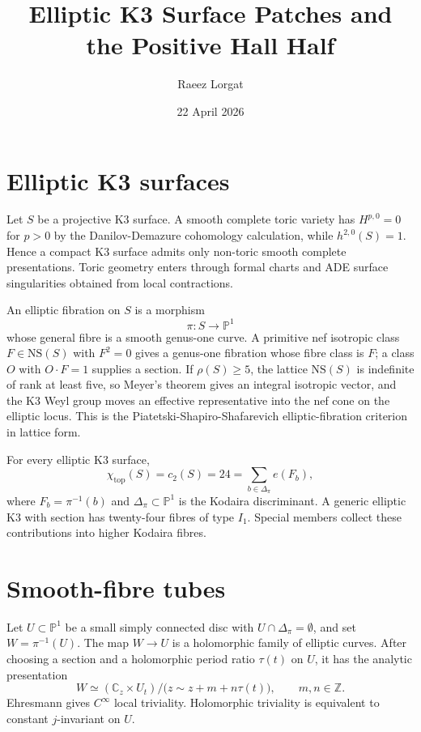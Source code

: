 \documentclass[11pt]{article}
\theoremstyle{plain}
\theoremstyle{definition}
\theoremstyle{remark}
\providecommand{\PP}{\mathbb{P}}
\providecommand{\CC}{\mathbb{C}}
\providecommand{\ZZ}{\mathbb{Z}}
\providecommand{\NS}{\mathrm{NS}}
\begin{document}
\title{Elliptic K3 Surface Patches and the Positive Hall Half}
\author{Raeez Lorgat}
\date{22 April 2026}
\maketitle

\section{Elliptic K3 surfaces}

Let $S$ be a projective K3 surface. A smooth complete toric variety
has $H^{p,0}=0$ for $p>0$ by the Danilov-Demazure cohomology
calculation, while $h^{2,0}(S)=1$. Hence a compact K3 surface admits
only non-toric smooth complete presentations. Toric geometry enters
through formal charts and ADE surface singularities obtained from local
contractions.

An elliptic fibration on $S$ is a morphism
\[
 \pi\colon S \longrightarrow \PP^1
\]
whose general fibre is a smooth genus-one curve. A primitive nef
isotropic class $F\in\NS(S)$ with $F^2=0$ gives a genus-one fibration
whose fibre class is $F$; a class $O$ with $O\cdot F=1$ supplies a
section. If $\rho(S)\geq 5$,
the lattice $\NS(S)$ is indefinite of rank at least five, so Meyer's
theorem gives an integral isotropic vector, and the K3 Weyl group
moves an effective representative into the nef cone on the elliptic
locus. This is the Piatetski-Shapiro-Shafarevich elliptic-fibration
criterion in lattice form.

For every elliptic K3 surface,
\[
 \chi_{\mathrm{top}}(S)=c_2(S)=24
   = \sum_{b\in\Delta_\pi} e(F_b),
\]
where $F_b=\pi^{-1}(b)$ and $\Delta_\pi\subset\PP^1$ is the Kodaira
discriminant. A generic elliptic K3 with section has twenty-four
fibres of type $I_1$. Special members collect these contributions
into higher Kodaira fibres.

\section{Smooth-fibre tubes}

Let $U\subset\PP^1$ be a small simply connected disc with
$U\cap\Delta_\pi=\emptyset$, and set $W=\pi^{-1}(U)$. The map
$W\to U$ is a holomorphic family of elliptic curves. After choosing a
section and a holomorphic period ratio $\tau(t)$ on $U$, it has the
analytic presentation
\[
 W \simeq (\CC_z\times U_t)/
 \bigl(z\sim z+m+n\tau(t)\bigr),\qquad m,n\in\ZZ.
\]
Ehresmann gives $C^\infty$ local triviality. Holomorphic triviality is
equivalent to constant $j$-invariant on $U$.
\end{document}
